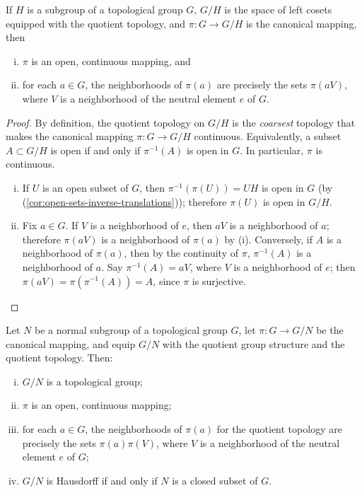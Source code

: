 \begin{lemma}
    If \( H \) is a subgroup of a topological group \( G \), \( G/H \) is the space of left cosets equipped with the quotient topology, and \( \pi : G \to G/H \) is the canonical mapping, then
    \begin{enumerate}[(i)]
        \item \( \pi \) is an open, continuous mapping, and
        \item for each \( a \in G \), the neighborhoods of \( \pi(a) \) are precisely the sets \( \pi(aV) \), where \( V \) is a neighborhood of the neutral element \( e \) of \( G \).
    \end{enumerate}
\end{lemma}

\begin{proof}
    By definition, the quotient topology on \( G/H \) is the \emph{coarsest} topology that makes the canonical mapping \( \pi : G \to G/H \) continuous. Equivalently, a subset \( A \subset G/H \) is open if and only if \( \pi^{-1}(A) \) is open in \( G \). In particular, \( \pi \) is continuous.


    \begin{enumerate}[(i)]
        \item If \( U \) is an open subset of \( G \), then \( \pi^{-1}(\pi(U)) = UH \) is open in \( G \) (by (\ref{cor:open-sets-inverse-translations})); therefore \( \pi(U) \) is open in \( G/H \).

        \item Fix \( a \in G \). If \( V \) is a neighborhood of \( e \), then \( aV \) is a neighborhood of \( a \); therefore \( \pi(aV) \) is a neighborhood of \( \pi(a) \) by (i).
              Conversely, if \( A \) is a neighborhood of \( \pi(a) \), then by the continuity of \( \pi \), \( \pi^{-1}(A) \) is a neighborhood of \( a \).
              Say \( \pi^{-1}(A) = aV \), where \( V \) is a neighborhood of \( e \); then \( \pi(aV) = \pi(\pi^{-1}(A)) = A \), since \( \pi \) is surjective.
    \end{enumerate}
\end{proof}
\begin{theorem}
    Let \( N \) be a normal subgroup of a topological group \( G \), let
    \(\pi : G \to G/N\) be the canonical mapping, and equip \( G/N \) with the quotient group structure and the quotient topology.
    Then:
    \begin{enumerate}[(i)]
        \item \( G/N \) is a topological group;
        \item \(\pi\) is an open, continuous mapping;
        \item for each \( a \in G \), the neighborhoods of \(\pi(a)\) for the quotient topology are precisely the sets \(\pi(a)\pi(V)\), where \(V\) is a neighborhood of the neutral element \(e\) of \(G\);
        \item \(G/N\) is Hausdorff if and only if \(N\) is a closed subset of \(G\).
    \end{enumerate}
\end{theorem}

